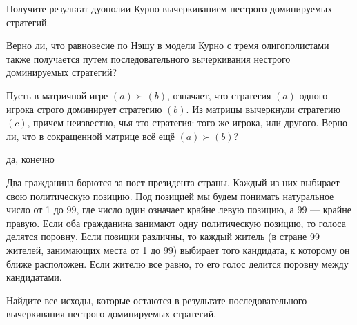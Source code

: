 \begin{problem}
Получите результат дуополии Курно вычеркиванием нестрого доминируемых стратегий.\par
Верно ли, что равновесие по Нэшу в модели Курно с тремя олигополистами также получается путем последовательного вычеркивания нестрого доминируемых стратегий?

\begin{sol}

\end{sol}
\end{problem}



\begin{problem}
Пусть в матричной игре  $\left(a\right)\succ \left(b\right)$, означает, что стратегия  $\left(a\right)$  одного игрока строго доминирует стратегию  $\left(b\right)$. Из матрицы вычеркнули стратегию  $\left(c\right)$, причем неизвестно, чья это стратегия: того же игрока, или другого. Верно ли, что в сокращенной матрице всё ещё   $\left(a\right)\succ \left(b\right)$?




\begin{sol}
да, конечно
\end{sol}
\end{problem}




\begin{problem}[Президент]
Два гражданина борются за пост президента страны. Каждый из них выбирает свою политическую позицию. Под позицией мы будем понимать натуральное число от 1 до 99, где число один означает крайне левую позицию, а 99 --- крайне правую. Если оба гражданина занимают одну политическую позицию, то голоса делятся поровну. Если позиции различны, то каждый житель (в стране 99 жителей, занимающих места от 1 до 99) выбирает того кандидата, к которому он ближе расположен. Если жителю все равно, то его голос делится поровну между кандидатами.\par
Найдите все исходы, которые остаются в результате последовательного вычеркивания нестрого доминируемых стратегий.



\begin{sol}

\end{sol}
\end{problem}

